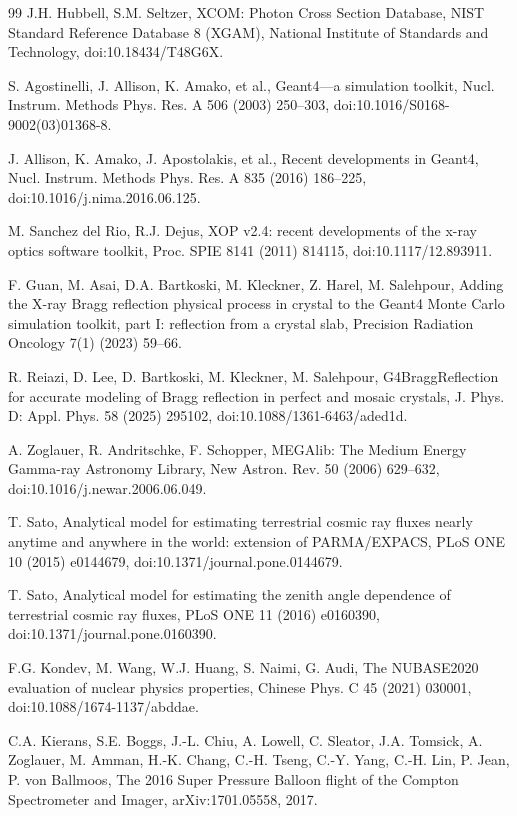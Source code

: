 \documentclass[11pt]{article}
\begin{document}
\begin{thebibliography}{99}
J.H. Hubbell, S.M. Seltzer, XCOM: Photon Cross Section Database, NIST Standard Reference Database 8 (XGAM), National Institute of Standards and Technology, doi:10.18434/T48G6X.

S. Agostinelli, J. Allison, K. Amako, et al., Geant4---a simulation toolkit, Nucl. Instrum. Methods Phys. Res. A 506 (2003) 250--303, doi:10.1016/S0168-9002(03)01368-8.

J. Allison, K. Amako, J. Apostolakis, et al., Recent developments in Geant4, Nucl. Instrum. Methods Phys. Res. A 835 (2016) 186--225, doi:10.1016/j.nima.2016.06.125.

M. Sanchez del Rio, R.J. Dejus, XOP v2.4: recent developments of the x-ray optics software toolkit, Proc. SPIE 8141 (2011) 814115, doi:10.1117/12.893911.

F. Guan, M. Asai, D.A. Bartkoski, M. Kleckner, Z. Harel, M. Salehpour, Adding the X-ray Bragg reflection physical process in crystal to the Geant4 Monte Carlo simulation toolkit, part I: reflection from a crystal slab, Precision Radiation Oncology 7(1) (2023) 59--66.

R. Reiazi, D. Lee, D. Bartkoski, M. Kleckner, M. Salehpour, G4BraggReflection for accurate modeling of Bragg reflection in perfect and mosaic crystals, J. Phys. D: Appl. Phys. 58 (2025) 295102, doi:10.1088/1361-6463/aded1d.

A. Zoglauer, R. Andritschke, F. Schopper, MEGAlib: The Medium Energy Gamma-ray Astronomy Library, New Astron. Rev. 50 (2006) 629--632, doi:10.1016/j.newar.2006.06.049.

T. Sato, Analytical model for estimating terrestrial cosmic ray fluxes nearly anytime and anywhere in the world: extension of PARMA/EXPACS, PLoS ONE 10 (2015) e0144679, doi:10.1371/journal.pone.0144679.

T. Sato, Analytical model for estimating the zenith angle dependence of terrestrial cosmic ray fluxes, PLoS ONE 11 (2016) e0160390, doi:10.1371/journal.pone.0160390.

F.G. Kondev, M. Wang, W.J. Huang, S. Naimi, G. Audi, The NUBASE2020 evaluation of nuclear physics properties, Chinese Phys. C 45 (2021) 030001, doi:10.1088/1674-1137/abddae.

C.A. Kierans, S.E. Boggs, J.-L. Chiu, A. Lowell, C. Sleator, J.A. Tomsick, A. Zoglauer, M. Amman, H.-K. Chang, C.-H. Tseng, C.-Y. Yang, C.-H. Lin, P. Jean, P. von Ballmoos, The 2016 Super Pressure Balloon flight of the Compton Spectrometer and Imager, arXiv:1701.05558, 2017.


\end{thebibliography}
\end{document}
